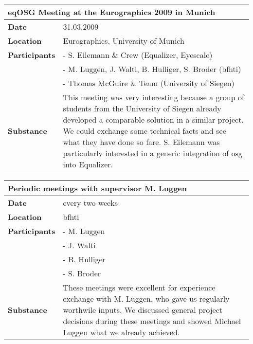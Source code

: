 \begin{table}[H]
	\centering
	\begin{tabular}{|b{}|b{}|}
		\hline
 		\multicolumn{2}{|l|}{\bfseries eqOSG Meeting at the Eurographics 2009 in Munich} \\
		\hline\hline
		\bfseries Date & 31.03.2009 \\
		\hline
		\bfseries Location & Eurographics, University of Munich \\
		\hline
		\bfseries Participants & - S. Eilemann \& Crew (Equalizer, Eyescale) \\
		&- M. Luggen, J. Walti, B. Hulliger, S. Broder (\gls{bfhti}) \\
		&- Thomas McGuire \& Team (University of Siegen) \\
		\hline
		\bfseries Substance & This meeting was very interesting because a group of students from the University of Siegen already developed a comparable solution in a similar project. We could exchange some technical facts and see what they have done so fare. S. Eilemann was particularly interested in a generic integration of \gls{osg} into Equalizer.\\
		\hline
	\end{tabular}
\end{table}

\begin{table}[H]
	\centering
	\begin{tabular}{|b{}|b{}|}
		\hline
 		\multicolumn{2}{|l|}{\bfseries Periodic meetings with supervisor M. Luggen} \\
		\hline\hline
		\bfseries Date & every two weeks \\
		\hline
		\bfseries Location & \gls{bfhti} \\
		\hline
		\bfseries Participants & - M. Luggen \\
		& - J. Walti \\
		& - B. Hulliger \\
		& - S. Broder \\
		\hline
		\bfseries Substance & These meetings were excellent for experience exchange with M. Luggen, who gave us regularly worthwile inputs. We discussed general project decisions during these meetings and showed Michael Luggen what we already achieved. \\
		\hline
	\end{tabular}
\end{table}